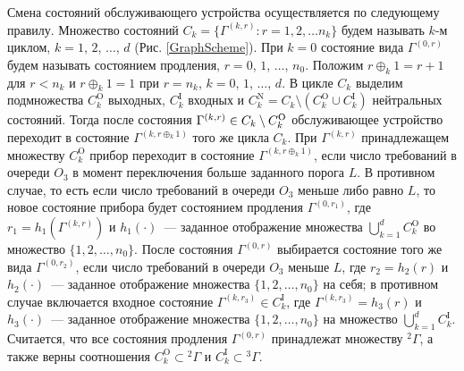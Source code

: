 \documentclass[a4paper,12pt,russian]{extarticle}
\newcommand{\G}{\Gamma}
\newcommand{\ga}[1]{\Gamma^{\left( #1 \right)} }
\begin{document}
Смена состояний обслуживающего устройства осуществляется по следующему правилу. Множество состояний $C_k = \{\G^{(k,r)} \colon r=1,2,\ldots n_k\}$ будем называть $k$-м циклом, $k=1$, $2$, $\ldots$, $d$ (Рис. \ref{GraphScheme}). При $k=0$ состояние вида $\ga{0,r}$ будем называть состоянием продления, $r=0$, $1$, $\ldots$, $n_0$. Положим $r \oplus_k 1 = r+1$ для $r<n_k$ и $r \oplus_k 1 = 1$ при $r=n_k$, $k = 0$, $1$, $\ldots$, $d$. В цикле $C_k$ выделим подмножества $C_k^{\mathrm{O}}$ выходных, $C_k^{\mathrm{I}}$ входных и $C_k^{\mathrm{N}} = C_k \setminus (C_k^{\mathrm{O}} \cup C_k^{\mathrm{I}})$ нейтральных состояний. Тогда после состояния $\ga{k,r} \hm\in C_k\setminus C_k^{\mathrm{O}}$ обслуживающее устройство переходит в состояние $\ga{k,r \oplus_k 1}$ того же цикла $C_k$. При $\ga{k,r}$ принадлежащем множеству $C_k^{\mathrm{O}}$ прибор переходит в состояние $\ga{k,r\oplus_k 1}$, если число требований в очереди $O_3$ в момент переключения больше заданного порога $L$. В противном случае, то есть если число требований в очереди $O_3$ меньше либо равно $L$, то новое состояние прибора будет состоянием продления $\ga{0,r_1}$, где $r_1=h_1(\ga{k,r})$ и $h_1(\cdot)$~--- заданное отображение множества $\bigcup\limits_{k=1}^d C_k^{\mathrm{O}}$ во множество $\{1,2,\ldots, n_0\}$. После состояния $\ga{0,r}$ выбирается состояние того же вида $\ga{0,r_2}$, если число требований в очереди $O_3$ меньше $L$, где $r_2=h_2(r)$ и $h_2(\cdot)$~--- заданное отображение множества $\{1,2, \ldots, n_0\}$ на себя; в противном случае включается входное состояние $\ga{k,r_3} \in C_k^{\mathrm{I}}$, где $\ga{k,r_3}=h_3(r)$ и $h_3(\cdot)$~--- заданное отображение множества $\{1,2, \ldots, n_0\}$ на множество  $\bigcup\limits_{k=1}^d C_k^{\mathrm{I}}$. Считается, что все состояния продления $\ga{0,r}$ принадлежат множеству ${}^2 \G$, а также верны соотношения $C_k^\mathrm{O}\subset {}^2 \G$ и $C_k^\mathrm{I}\subset {}^3 \G$.
\end{document}
